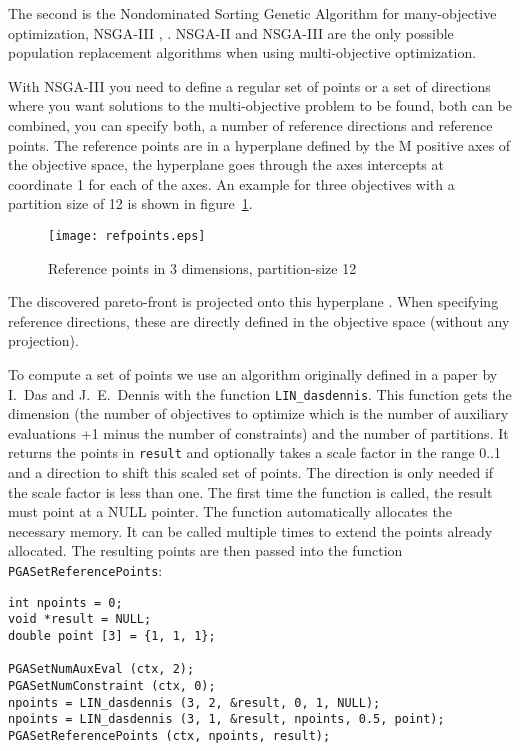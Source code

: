 \documentclass{report}
\begin{document}
The second is the Nondominated Sorting Genetic Algorithm for
many-objective optimization, NSGA-III \cite{DJ14}, \cite{JD14}.
NSGA-II and NSGA-III are the only possible population replacement
algorithms when using multi-objective optimization.

With NSGA-III you need to define a regular set of points or
a set of directions where you want solutions to the multi-objective
problem to be found, both can be combined, you can specify both, a
number of reference directions and reference points. The reference
points are in a hyperplane defined by the M positive axes of the
objective space, the hyperplane goes through the axes intercepts at
coordinate 1 for each of the axes. An example for three objectives with
a partition size of 12 is shown in figure~\ref{fig:refpoints}.

\begin{figure}
\centerline{\texttt{[image: refpoints.eps]}}
\caption{Reference points in 3 dimensions, partition-size 12}
\label{fig:refpoints}
\end{figure}

The discovered pareto-front is
projected onto this hyperplane \cite{BDR19}. When specifying reference
directions, these are directly defined in the objective space (without
any projection).

To compute a set of points we use an algorithm
originally defined in a paper by I.~Das and J.~E.~Dennis \cite{DD98}
with the function \verb+LIN_dasdennis+. This function gets the dimension
(the number of objectives to optimize which is the number of auxiliary
evaluations +1 minus the number of constraints) and the number of
partitions. It returns the points in \verb+result+ and optionally takes
a scale factor in the range 0..1 and a direction to shift this scaled
set of points. The direction is only needed if the scale factor is less
than one. The first time the function is called, the result must
point at a NULL pointer. The function automatically allocates the
necessary memory. It can be called multiple times to extend the points
already allocated. The resulting points are then passed into the
function \verb+PGASetReferencePoints+:

\begin{verbatim}
int npoints = 0;
void *result = NULL;
double point [3] = {1, 1, 1};

PGASetNumAuxEval (ctx, 2);
PGASetNumConstraint (ctx, 0);
npoints = LIN_dasdennis (3, 2, &result, 0, 1, NULL);
npoints = LIN_dasdennis (3, 1, &result, npoints, 0.5, point);
PGASetReferencePoints (ctx, npoints, result);
\end{verbatim}
\end{document}
